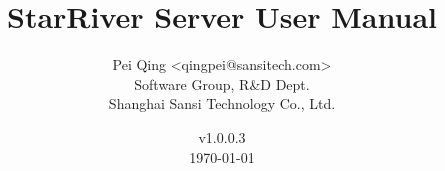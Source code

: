 \title{\textbf{StarRiver Server User Manual}}

\author{Pei Qing <qingpei@sansitech.com> \\
        Software Group, R\&D Dept.\\
        Shanghai Sansi Technology Co., Ltd.
}

\date{\vspace{3em} v1.0.0.3 \\\vspace{3em} \today}
